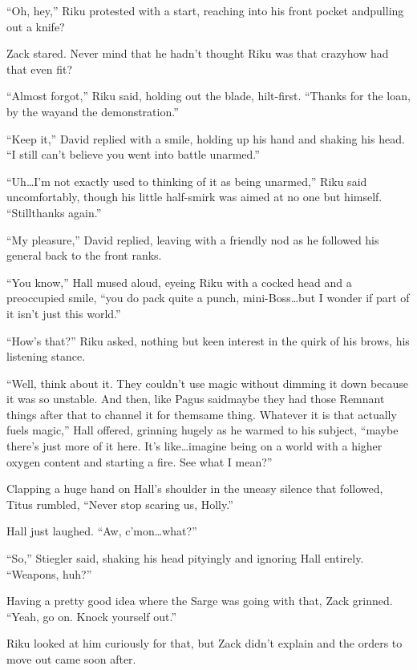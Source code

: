``Oh, hey,'' Riku protested with a start, reaching into his front pocket and\textemdash pulling out a knife?

Zack stared. Never mind that he hadn't thought Riku was that crazy\textemdash how had that even fit?

``Almost forgot,'' Riku said, holding out the blade, hilt-first. ``Thanks for the loan, by the way\textemdash and the demonstration.''

``Keep it,'' David replied with a smile, holding up his hand and shaking his head. ``I still can't believe you went into battle unarmed.''

``Uh\ldots I'm not exactly used to thinking of it as being unarmed,'' Riku said uncomfortably, though his little half-smirk was aimed at no one but himself. ``Still\textemdash thanks again.''

``My pleasure,'' David replied, leaving with a friendly nod as he followed his general back to the front ranks.

``You know,'' Hall mused aloud, eyeing Riku with a cocked head and a preoccupied smile, ``you do pack quite a punch, mini-Boss\ldots but I wonder if part of it isn't just this world.''

``How's that?'' Riku asked, nothing but keen interest in the quirk of his brows, his listening stance.

``Well, think about it. They couldn't use magic without dimming it down because it was so unstable. And then, like Pagus said\textemdash maybe they had those Remnant things after that to channel it for them\textemdash same thing. Whatever it is that actually fuels magic,'' Hall offered, grinning hugely as he warmed to his subject, ``maybe there's just more of it here. It's like\ldots imagine being on a world with a higher oxygen content and starting a fire. See what I mean?''

Clapping a huge hand on Hall's shoulder in the uneasy silence that followed, Titus rumbled, ``Never stop scaring us, Holly.''

Hall just laughed. ``Aw, c'mon\ldots what?''

``So,'' Stiegler said, shaking his head pityingly and ignoring Hall entirely. ``Weapons, huh?''

Having a pretty good idea where the Sarge was going with that, Zack grinned. ``Yeah, go on. Knock yourself out.''

Riku looked at him curiously for that, but Zack didn't explain and the orders to move out came soon after.

